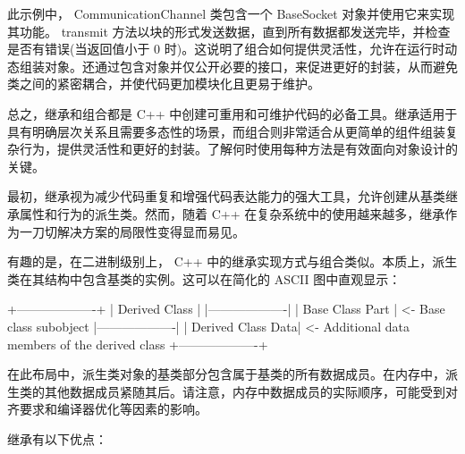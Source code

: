 此示例中， CommunicationChannel 类包含一个 BaseSocket 对象并使用它来实现其功能。 transmit 方法以块的形式发送数据，直到所有数据都发送完毕，并检查是否有错误(当返回值小于 0 时)。这说明了组合如何提供灵活性，允许在运行时动态组装对象。还通过包含对象并仅公开必要的接口，来促进更好的封装，从而避免类之间的紧密耦合，并使代码更加模块化且更易于维护。

总之，继承和组合都是 C++ 中创建可重用和可维护代码的必备工具。继承适用于具有明确层次关系且需要多态性的场景，而组合则非常适合从更简单的组件组装复杂行为，提供灵活性和更好的封装。了解何时使用每种方法是有效面向对象设计的关键。


最初，继承视为减少代码重复和增强代码表达能力的强大工具，允许创建从基类继承属性和行为的派生类。然而，随着 C++ 在复杂系统中的使用越来越多，继承作为一刀切解决方案的局限性变得显而易见。


有趣的是，在二进制级别上， C++ 中的继承实现方式与组合类似。本质上，派生类在其结构中包含基类的实例。这可以在简化的 ASCII 图中直观显示：

\begin{shell}
+-------------------+
| Derived Class     |
|-------------------|
| Base Class Part   | <- Base class subobject
|-------------------|
| Derived Class Data| <- Additional data members of the derived class
+-------------------+
\end{shell}

在此布局中，派生类对象的基类部分包含属于基类的所有数据成员。在内存中，派生类的其他数据成员紧随其后。请注意，内存中数据成员的实际顺序，可能受到对齐要求和编译器优化等因素的影响。


继承有以下优点：

